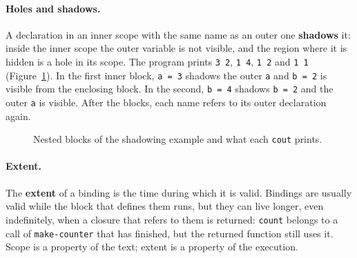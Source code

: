 \paragraph{Holes and shadows.} A declaration in an inner scope with the same
name as an outer one \textbf{shadows} it: inside the inner scope the outer
variable is not visible, and the region where it is hidden is a hole in its
scope.
The program prints \texttt{3 2}, \texttt{1 4}, \texttt{1 2} and \texttt{1 1}
(Figure~\ref{fig:shadows}). In the first inner block, \texttt{a = 3} shadows
the outer \texttt{a} and \texttt{b = 2} is visible from the enclosing block.
In the second, \texttt{b = 4} shadows \texttt{b = 2} and the outer \texttt{a} is
visible. After the blocks, each name refers to its outer declaration again.

\begin{figure}[h]
\centering
{}
\caption{Nested blocks of the shadowing example and what each \texttt{cout} prints.}
\label{fig:shadows}
\end{figure}

\paragraph{Extent.} The \textbf{extent} of a binding is the time during which
it is valid. Bindings are usually valid while the block that defines them
runs, but they can live longer, even indefinitely, when a closure that
refers to them is returned:
\texttt{count} belongs to a call of \texttt{make-counter} that has finished,
but the returned function still uses it. Scope is a property of the text;
extent is a property of the execution.

